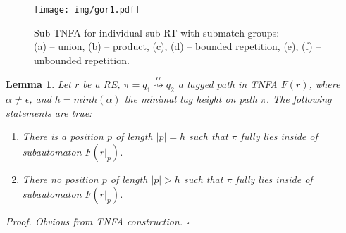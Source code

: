 \documentclass[AMA,STIX1COL]{WileyNJD-v2}
\newtheorem{XLem}{Lemma}
\begin{document}
\begin{figure}\label{fig_gor1}
\texttt{[image: img/gor1.pdf]}
\caption{
Sub-TNFA for individual sub-RT with submatch groups: \\
(a) -- union, (b) -- product, (c), (d) -- bounded repetition, (e), (f) -- unbounded repetition.
}
\end{figure}

    \begin{XLem}\label{gor1_path_containment}
    Let $r$ be a RE, $\pi = q_1 \overset {\alpha} {\rightsquigarrow} q_2$ a tagged path in TNFA $F(r)$,
    where $\alpha \neq \epsilon$,
    and $h = minh (\alpha)$ the minimal tag height on path $\pi$.
    The following statements are true:
    \begin{enumerate}
        \item There is a position $p$ of length $|p| = h$
            such that $\pi$ fully lies inside of subautomaton $F(r|_p)$.

        \item There no position $p$ of length $|p| > h$
            such that $\pi$ fully lies inside of subautomaton $F(r|_p)$.
    \end{enumerate}
    Proof.
    Obvious from TNFA construction.
    $\square$
    \end{XLem}
\end{document}
